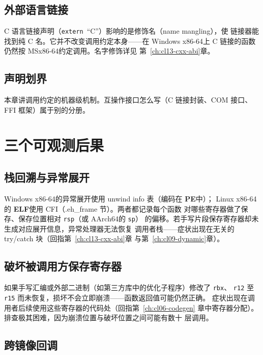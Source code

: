 \documentclass[12pt,a4paper,fontset=fandol]{ctexbook}
\newcommand{\Tp}[1]{\texttt{#1}}
\newcommand{\Elf}{\textbf{\textsf{ELF}}}
\newcommand{\PeFmt}{\textbf{\textsf{PE}}}
\newcommand{\Nix}{\textsf{Linux}}
\newcommand{\Win}{\textsf{Windows}}
\newcommand{\xSixtyFour}{\textsf{x86-64}}
\newcommand{\ArmSixtyFour}{\textsf{AArch64}}
\begin{document}
\subsection{外部语言链接}\label{sec:cl10-extern-lang}

C 语言链接声明（\Tp{extern}~``C''）影响的是修饰名（name mangling），使
链接器能找到纯 C 名。它并不改变调用约定本身——在 \Win{} \xSixtyFour 上
C 链接的函数仍然按 MS\xSixtyFour 约定调用。名字修饰详见
第~\ref{ch:cl13-cxx-abi}章。

\subsection{声明划界}\label{sec:cl10-scope}

本章讲调用约定的机器级机制。互操作接口怎么写（C 链接封装、COM 接口、
FFI 框架）属于别的分册。

\section{三个可观测后果}\label{sec:cl10-consequences}

\subsection{栈回溯与异常展开}\label{sec:cl10-unwind}

\begin{abibox}[title={回溯与展开}]
\Win{} \xSixtyFour 的异常展开使用 unwind info 表（编码在 \PeFmt 中）；
\Nix{} \xSixtyFour 的 \Elf 使用 CFI（.eh\_frame 节）。两者都记录每个函数
对哪些寄存器做了保存、保存位置相对 \Tp{rsp}（或 \ArmSixtyFour 的 \Tp{sp}）
的偏移。若手写片段保存寄存器却未生成对应展开信息，异常处理器无法恢复
调用者栈——症状出现在无关的 try/catch 块（回指第~\ref{ch:cl13-cxx-abi}章
与第~\ref{ch:cl09-dynamic}章）。
\end{abibox}

\subsection{破坏被调用方保存寄存器}\label{sec:cl10-clobber}

如果手写汇编或外部二进制（如第三方库中的优化子程序）修改了 \Tp{rbx}、
\Tp{r12} 至 \Tp{r15} 而未恢复，损坏不会立即崩溃——函数返回值可能仍然正确。
症状出现在调用者后续使用这些寄存器的代码处（回指第~\ref{ch:cl06-codegen}
章中寄存器分配）。排查极其困难，因为崩溃位置与破坏位置之间可能有数十
层调用。

\subsection{跨镜像回调}\label{sec:cl10-callback}
\end{document}
